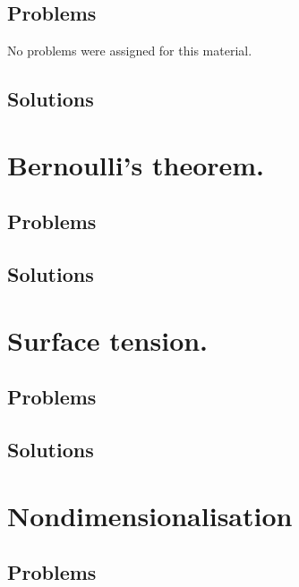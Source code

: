       \section{Problems}
         No problems were assigned for this material.
      \section{Solutions}
         \shipoutAnswer

   \chapter{Bernoulli's theorem.}
      
      
      \section{Problems}
         
         
      \section{Solutions}
         \shipoutAnswer

   \chapter{Surface tension.}
      
      \section{Problems}
         
      \section{Solutions}
         \shipoutAnswer

   \chapter{Nondimensionalisation}
      
      
      
      \section{Problems}
         
